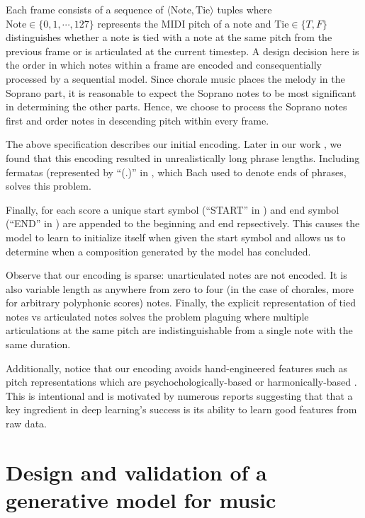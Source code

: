 \documentclass[dissertation.tex]{subfiles}
\begin{document}
Each frame consists of a sequence of $\langle \text{Note}, \text{Tie} \rangle$
tuples where $\text{Note} \in \{0,1,\cdots,127\}$ represents the MIDI pitch of
a note and $\text{Tie} \in \{T,F\}$ distinguishes whether a note is tied with a
note at the same pitch from the previous frame or is articulated at the current
timestep. A design decision here is the order in which notes within a frame are
encoded and consequentially processed by a sequential model. Since chorale
music places the melody in the Soprano part, it is reasonable to expect the
Soprano notes to be most significant in determining the other parts. Hence, we
choose to process the Soprano notes first and order notes in descending pitch
within every frame.

The above specification describes our initial encoding. Later in our work
, we found that this encoding resulted in unrealistically long
phrase lengths. Including fermatas (represented by ``(.)'' in , which Bach used to denote ends of phrases, solves this problem.

Finally, for each score a unique start symbol (``START'' in ) and
end symbol (``END'' in ) are appended to the beginning and end
repsectively. This causes the model to learn to initialize itself when given
the start symbol and allows us to determine when a composition generated by the
model has concluded.

Observe that our encoding is sparse: unarticulated notes are not encoded. It is
also variable length as anywhere from zero to four (in the case of chorales,
more for arbitrary polyphonic scores) notes. Finally, the explicit
representation of tied notes vs articulated notes solves the problem plaguing
\cite{Eck2002}\cite{eck2008learning} \cite{Liu2014} \cite{Brien2016} where
multiple articulations at the same pitch are indistinguishable from a single
note with the same duration.

Additionally, notice that our encoding avoids hand-engineered features such as
pitch representations which are psychochologically-based \cite{mozer1994neural}
or harmonically-based \cite{franklin2004recurrent}
\cite{laden1989representation}. This is intentional and is motivated by
numerous reports \cite{bengio2009learning}\cite{Bengio2011} suggesting that
that a key ingredient in deep learning's success is its ability to learn good
features from raw data.

\section{Design and validation of a generative model for music}
\end{document}
